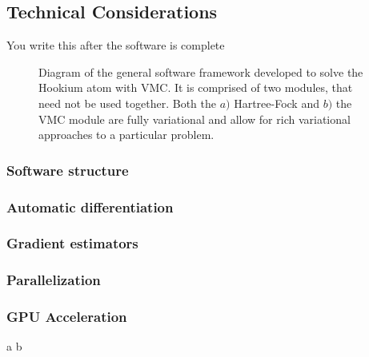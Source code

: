 \documentclass[final,3p,times,twocolumn]{elsarticle}
\begin{document}
	\subsection{Technical Considerations}
	You write this after the software is complete
	
	\begin{figure}[h]
		\vspace*{-2cm}
		\caption{Diagram of the general software framework developed to solve the Hookium atom with VMC. It is comprised of two modules, that need not be used together. Both the $a)$ Hartree-Fock and $b)$ the VMC module are fully variational and allow for rich variational approaches to a particular problem.}
	\end{figure}
	
	
	\subsubsection{Software structure}
	\subsubsection{Automatic differentiation}
	\subsubsection{Gradient estimators}
	\subsubsection{Parallelization}
	\subsubsection{GPU Acceleration}
	\newpage
		a
	\newpage
		b
	\newpage
\end{document}
